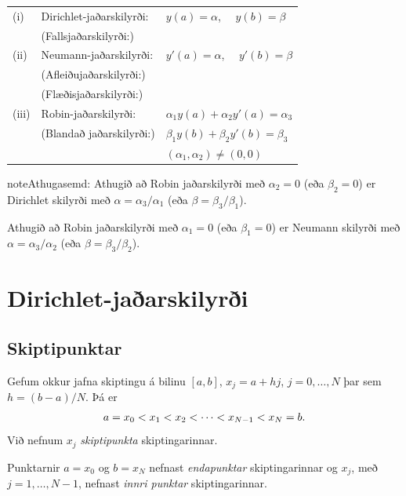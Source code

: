 \documentclass[letterpaper,10pt,icelandic]{sphinxmanual}
\begin{document}
\begin{tabular}{lll}
	(i)  &Dirichlet-jaðarskilyrði: &  $y(a)=\alpha$, \ \  $y(b)=\beta$\\
	&(Fallsjaðarskilyrði:) \\ 
	(ii)&Neumann-jaðarskilyrði: 
	& $y'(a)=\alpha$, \ \  $y'(b)=\beta$\\
	&(Afleiðujaðarskilyrði:)\\
	&(Flæðisjaðarskilyrði:)\\
	(iii)&Robin-jaðarskilyrði: 
	&$\alpha_1y(a)+\alpha_2 y'(a)=\alpha_3$ \\ 
	&(Blandað jaðarskilyrði:)&$\beta_1 y(b)+\beta_2y'(b)=\beta_3$\\
	&&$(\alpha_1,\alpha_2)\neq (0,0)$
\end{tabular}


\begin{notice}{note}{Athugasemd:}
Athugið að Robin jaðarskilyrði með \(\alpha_2=0\) (eða
\(\beta_2=0\)) er Dirichlet skilyrði með \(\alpha=\alpha_3/\alpha_1\) (eða
\(\beta=\beta_3/\beta_1\)).

Athugið að Robin jaðarskilyrði með \(\alpha_1=0\) (eða
\(\beta_1=0\))
er Neumann skilyrði með \(\alpha=\alpha_3/\alpha_2\) (eða
\(\beta=\beta_3/\beta_2\)).
\end{notice}


\section{Dirichlet-jaðarskilyrði}
\label{kafli07:dirichlet-jaarskilyri}

\subsection{Skiptipunktar}
\label{kafli07:skiptipunktar}\label{kafli07:index-2}
Gefum okkur jafna skiptingu á bilinu \([a,b]\), \(x_j=a+hj\),
\(j=0,\ldots,N\) þar sem \(h=(b-a)/N\). Þá er
\begin{gather}
\begin{split}a=x_0<x_1<x_2<\cdots<x_{N-1}<x_N=b.\end{split}\notag
\end{gather}
Við nefnum \(x_j\) \emph{skiptipunkta} skiptingarinnar.

Punktarnir \(a=x_0\) og \(b=x_N\) nefnast \emph{endapunktar}
skiptingarinnar og \(x_j\), með \(j=1,\dots,N-1\), nefnast
\emph{innri punktar} skiptingarinnar.
\end{document}
